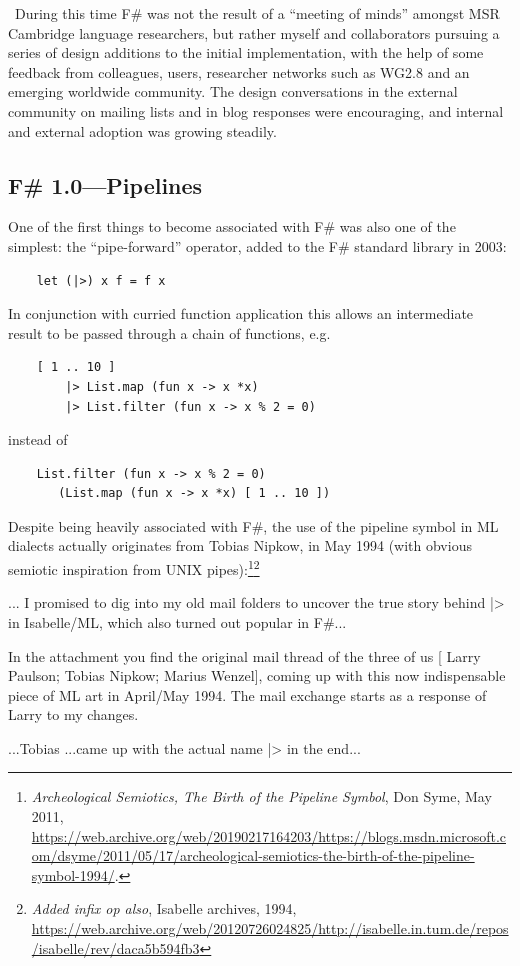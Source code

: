 \documentclass[acmsmall]{acmart}\settopmatter{}
\begin{document}
\
During this time F\# was not the result of a “meeting of minds” amongst MSR Cambridge language researchers, but rather myself and collaborators pursuing a series of design additions to the initial implementation, with the help of some feedback from colleagues, users, researcher networks such as WG2.8 and an emerging worldwide community.  The design conversations in the external community on mailing lists and in blog responses were encouraging, and internal and external adoption was growing steadily. 
\subsection*{F\# 1.0---Pipelines}

One of the first things to become associated with F\# was also one of the simplest: the “pipe-forward” operator, added to the F\# standard library in 2003:
\begin{verbatim}
    let (|>) x f = f x
\end{verbatim}
In conjunction with curried function application this allows an intermediate result to be passed through a chain of functions, e.g.
\begin{verbatim}
    [ 1 .. 10 ] 
        |> List.map (fun x -> x *x) 
        |> List.filter (fun x -> x % 2 = 0)
\end{verbatim}
instead of 
\begin{verbatim}
    List.filter (fun x -> x % 2 = 0) 
       (List.map (fun x -> x *x) [ 1 .. 10 ])
\end{verbatim}
Despite being heavily associated with F\#, the use of the pipeline symbol in ML dialects actually originates from Tobias Nipkow, in May 1994 (with obvious semiotic inspiration from UNIX pipes):\footnote{\textit{Archeological Semiotics, The Birth of the Pipeline Symbol}, Don Syme, May 2011, \url{https://web.archive.org/web/20190217164203/https://blogs.msdn.microsoft.com/dsyme/2011/05/17/archeological-semiotics-the-birth-of-the-pipeline-symbol-1994/}.}\footnote{\textit{Added infix op also}, Isabelle archives, 1994, \url{https://web.archive.org/web/20120726024825/http://isabelle.in.tum.de/repos/isabelle/rev/daca5b594fb3}}
\begin{verbquote}
... I promised to dig into my old mail folders to uncover the true story behind |> in Isabelle/ML, which also turned out popular in F#...

In the attachment you find the original mail thread of the three of us [ Larry Paulson; Tobias Nipkow; Marius Wenzel], coming up with this now indispensable piece of ML art in April/May 1994. The mail exchange starts as a response of Larry to my changes.  

...Tobias ...came up with the actual name |> in the end...
\end{verbquote}
\end{document}
